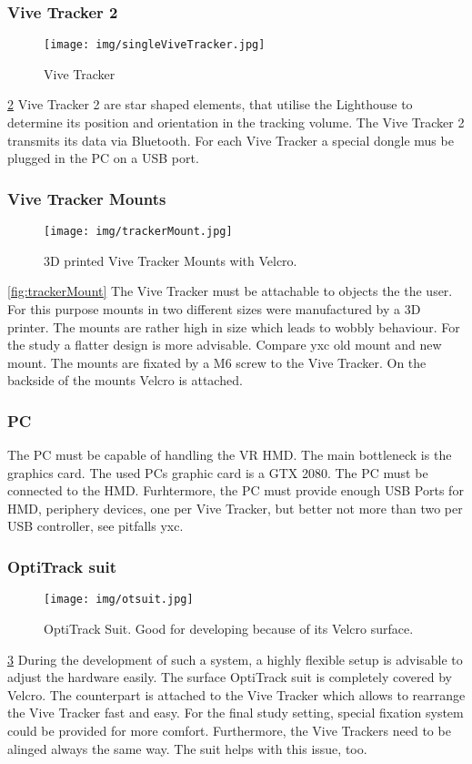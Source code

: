 \subsubsection{Vive Tracker 2}
\begin{figure}
	\centering
	\texttt{[image: img/singleViveTracker.jpg]}
	\caption{Vive Tracker}
	\label{fig:singleViveTracker}
\end{figure}
\ref{fig:singleViveTracker}
Vive Tracker 2 are star shaped elements, that utilise the Lighthouse to determine its position and orientation in the tracking volume. The Vive Tracker 2 transmits its data via Bluetooth. For each Vive Tracker a special dongle mus be plugged in the PC on a USB port.

\subsubsection{Vive Tracker Mounts}
\begin{figure}
	\centering
	\texttt{[image: img/trackerMount.jpg]}
	\caption{3D printed Vive Tracker Mounts with Velcro.}
	\label{fig:singleViveTracker}
\end{figure}
\ref{fig:trackerMount}
The Vive Tracker must be attachable to objects the the user. For this purpose mounts in two different sizes were manufactured by a 3D printer. The mounts are rather high in size which leads to wobbly behaviour. For the study a flatter design is more advisable. Compare yxc old mount and new mount. The mounts are fixated by a M6 screw to the Vive Tracker. On the backside of the mounts Velcro is attached.

\subsubsection{PC}
The PC must be capable of handling the VR HMD. The main bottleneck is the graphics card. The used PCs graphic card is a GTX 2080. The PC must be connected to the HMD. Furhtermore, the PC must provide enough USB Ports for HMD, periphery devices, one per Vive Tracker, but better not more than two per USB controller, see pitfalls yxc.

\subsubsection{OptiTrack suit}
\begin{figure}
	\centering
	\texttt{[image: img/otsuit.jpg]}
	\caption{OptiTrack Suit. Good for developing because of its Velcro surface.}
	\label{fig:otsuit}
\end{figure}
\ref{fig:otsuit}
During the development of such a system, a highly flexible setup is advisable to adjust the hardware easily. The surface OptiTrack suit is completely covered by Velcro. The counterpart is attached to the Vive Tracker which allows to rearrange the Vive Tracker fast and easy. For the final study setting, special fixation system could be provided for more comfort. Furthermore, the Vive Trackers need to be alinged always the same way. The suit helps with this issue, too.

